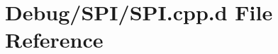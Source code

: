 \hypertarget{_debug_2_s_p_i_2_s_p_i_8cpp_8d}{\section{\-Debug/\-S\-P\-I/\-S\-P\-I.cpp.\-d \-File \-Reference}
\label{_debug_2_s_p_i_2_s_p_i_8cpp_8d}
}
